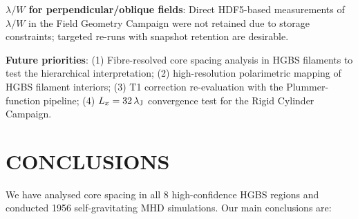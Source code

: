 \documentclass[twoside,twocolumn]{mnras}
\begin{document}
\textbf{$\lambda/W$ for perpendicular/oblique fields}: Direct HDF5-based measurements
of $\lambda/W$ in the Field Geometry Campaign were not retained due to storage constraints;
targeted re-runs with snapshot retention are desirable.

\textbf{Future priorities}: (1) Fibre-resolved core spacing analysis in HGBS filaments
to test the hierarchical interpretation; (2) high-resolution polarimetric mapping of
HGBS filament interiors; (3) T1 correction re-evaluation with the Plummer-function
pipeline; (4) $L_x = 32\,\lambda_{\rm J}$ convergence test for the Rigid Cylinder Campaign.

\section{CONCLUSIONS}

We have analysed core spacing in all 8 high-confidence HGBS regions and conducted
1956 self-gravitating MHD simulations. Our main conclusions are:
\end{document}
